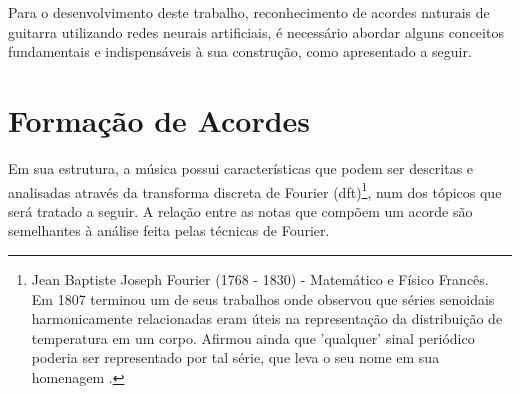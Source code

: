 
\localtableofcontents*


Para o desenvolvimento deste trabalho, reconhecimento de acordes naturais de guitarra utilizando redes neurais artificiais, é necessário abordar alguns conceitos fundamentais e indispensáveis à sua construção, como apresentado a seguir.

\section{Formação de Acordes}

Em sua estrutura, a música possui características que podem ser descritas e analisadas através da transforma discreta de Fourier (\gls{dft})\footnote{Jean Baptiste Joseph Fourier (1768 - 1830) - Matemático e Físico Francês. Em 1807 terminou um de seus trabalhos onde observou que séries senoidais harmonicamente relacionadas eram úteis na representação da distribuição de temperatura em um corpo. Afirmou ainda que 'qualquer' sinal periódico poderia ser representado por tal série, que leva o seu nome em sua homenagem \cite{oppen2010}.}, num dos tópicos que será tratado a seguir. A relação entre as notas que compõem um acorde são semelhantes à análise feita pelas técnicas de Fourier.


